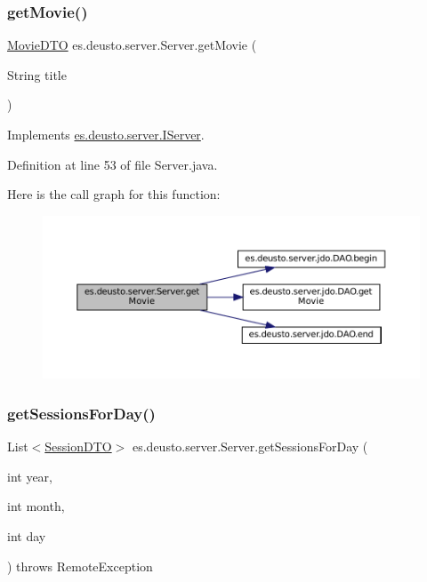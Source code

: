 \subsubsection{\texorpdfstring{getMovie()}{getMovie()}}
{\footnotesize\ttfamily \mbox{\hyperlink{classes_1_1deusto_1_1server_1_1data_1_1_movie_d_t_o}{Movie\+D\+TO}} es.\+deusto.\+server.\+Server.\+get\+Movie (\begin{DoxyParamCaption}\item[{String}]{title }\end{DoxyParamCaption})}



Implements \mbox{\hyperlink{interfacees_1_1deusto_1_1server_1_1_i_server_a2b7883e416d98a7c92de13cbed7af450}{es.\+deusto.\+server.\+I\+Server}}.



Definition at line 53 of file Server.\+java.

Here is the call graph for this function\+:
\nopagebreak
\begin{figure}[H]
\begin{center}
\leavevmode
\includegraphics[width=350pt]{classes_1_1deusto_1_1server_1_1_server_a7e4544c63bcf2b2d3abce0d2ff1567ac_cgraph}
\end{center}
\end{figure}
\mbox{\label{classes_1_1deusto_1_1server_1_1_server_a688ca336b3cbdb5c04ecdc4f23ff65d1}} 
\subsubsection{\texorpdfstring{getSessionsForDay()}{getSessionsForDay()}}
{\footnotesize\ttfamily List$<$\mbox{\hyperlink{classes_1_1deusto_1_1server_1_1data_1_1_session_d_t_o}{Session\+D\+TO}}$>$ es.\+deusto.\+server.\+Server.\+get\+Sessions\+For\+Day (\begin{DoxyParamCaption}\item[{int}]{year,  }\item[{int}]{month,  }\item[{int}]{day }\end{DoxyParamCaption}) throws Remote\+Exception}



